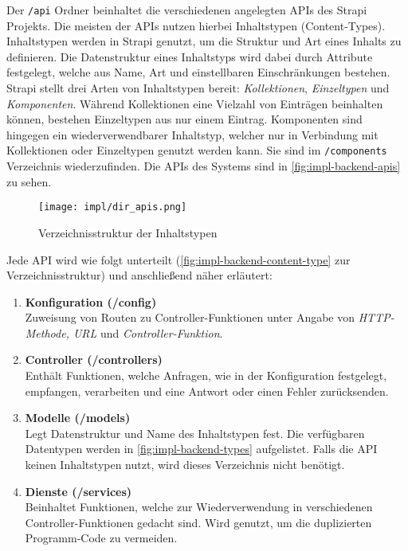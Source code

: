 Der \lstinline[style=code, style=inline]{/api} Ordner beinhaltet die
verschiedenen angelegten APIs des Strapi Projekts. Die meisten der APIs nutzen
hierbei Inhaltstypen (Content-Types). Inhaltstypen werden in Strapi genutzt, um
die Struktur und Art eines Inhalts zu definieren. Die Datenstruktur eines
Inhaltstyps wird dabei durch Attribute festgelegt, welche aus Name, Art und
einstellbaren Einschränkungen bestehen. Strapi stellt drei Arten von
Inhaltstypen bereit: \textit{Kollektionen}, \textit{Einzeltypen} und
\textit{Komponenten}. Während Kollektionen eine Vielzahl von Einträgen
beinhalten können, bestehen Einzeltypen aus nur einem Eintrag. Komponenten sind
hingegen ein wiederverwendbarer Inhaltstyp, welcher nur in Verbindung mit
Kollektionen oder Einzeltypen genutzt werden kann. Sie sind im
\lstinline[style=code, style=inline]{/components} Verzeichnis wiederzufinden.
Die APIs des Systems sind in \autoref{fig:impl-backend-apis} zu sehen.

\begin{figure}[htpb]
    \centering
    \texttt{[image: impl/dir\_apis.png]}
    \caption{Verzeichnisstruktur der Inhaltstypen}
    \label{fig:impl-backend-apis}
\end{figure}

Jede API wird wie folgt unterteilt (\autoref{fig:impl-backend-content-type}
zur Verzeichnisstruktur) und anschließend näher erläutert:

\begin{enumerate}
    \setlength{\itemsep}{1em}
    \item \textbf{Konfiguration (/config)} \\
          Zuweisung von Routen zu Controller-Funktionen unter Angabe von
          \textit{HTTP-Methode, URL} und \textit{Controller-Funktion}.
    \item \textbf{Controller (/controllers)} \\
          Enthält Funktionen, welche Anfragen, wie in der Konfiguration
          festgelegt, empfangen, verarbeiten und eine Antwort oder einen Fehler
          zurücksenden.
    \item \textbf{Modelle (/models)} \\
          Legt Datenstruktur und Name des Inhaltstypen fest. Die verfügbaren
          Datentypen werden in \autoref{fig:impl-backend-types} aufgelistet.
          Falls die API keinen Inhaltstypen nutzt, wird dieses Verzeichnis nicht
          benötigt.
    \item \textbf{Dienste (/services)} \\
          Beinhaltet Funktionen, welche zur Wiederverwendung in verschiedenen
          Controller-Funktionen gedacht sind. Wird genutzt, um die duplizierten
          Programm-Code zu vermeiden.
\end{enumerate}

